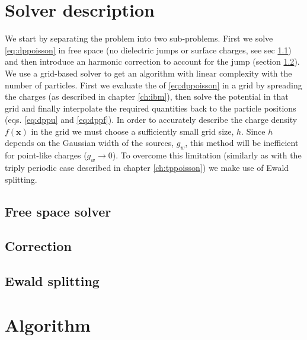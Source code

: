 \documentclass[ twoside,openright,titlepage,numbers=noenddot,%
headinclude,footinclude,cleardoublepage=empty,abstract=on,
BCOR=5mm,paper=a4,fontsize=11pt, dvipsnames
]{scrreprt}
\renewcommand{\vec}[1]{\bm{#1}}
\begin{document}
\section{Solver description}
We start by separating the problem into two sub-problems. First we solve \eqref{eq:dppoisson} in free space (no dielectric jumps or surface charges, see sec \ref{sec:dpsolver}) and then introduce an harmonic correction to account for the jump \bcs (section \ref{sec:dpcorr}).
We use a grid-based solver to get an algorithm with linear complexity with the number of particles. First we evaluate the \rhs of \eqref{eq:dppoisson} in a grid by spreading the charges (as described in chapter \ref{ch:ibm}), then solve the potential in that grid and finally interpolate the required quantities back to the particle positions (eqs. \eqref{eq:dppu} and \eqref{eq:dppf}).
In order to accurately describe the charge density $f(\vec{x})$ in the grid we must choose a sufficiently small grid size, $h$. Since $h$ depends on the Gaussian width of the sources, $g_w$, this method will be inefficient for point-like charges ($g_w\rightarrow 0$). To overcome this limitation (similarly as with the triply periodic case described in chapter \ref{ch:tppoisson}) we make use of Ewald splitting.

\subsection{Free space solver}\label{sec:dpsolver}


\subsection{Correction}\label{sec:dpcorr}

\subsection{Ewald splitting}\label{sec:dpewald}

\section{Algorithm}
\end{document}
